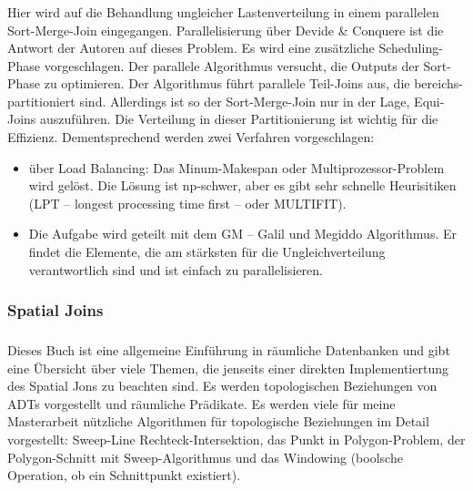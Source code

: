 \documentclass[a4paper,12pt,twoside]{article}
\begin{document}
\subsubsection*{}

Hier wird auf die Behandlung ungleicher Lastenverteilung in einem parallelen Sort-Merge-Join eingegangen. Parallelisierung über Devide \& Conquere ist die Antwort der Autoren auf dieses Problem. Es wird eine zusätzliche Scheduling-Phase vorgeschlagen. Der parallele Algorithmus versucht, die Outputs der Sort-Phase zu optimieren. Der Algorithmus führt parallele Teil-Joins aus, die bereichs-partitioniert sind. Allerdings ist so der Sort-Merge-Join nur in der Lage, Equi-Joins auszuführen. Die Verteilung in dieser Partitionierung ist wichtig für die Effizienz. Dementsprechend werden zwei Verfahren vorgeschlagen: 

\begin{itemize}
	\item über Load Balancing: Das Minum-Makespan oder Multiprozessor-Problem wird gelöst. Die Lösung ist np-schwer, aber es gibt sehr schnelle Heurisitiken (LPT -- longest processing time first -- oder MULTIFIT).
	\item Die Aufgabe wird geteilt mit dem GM -- Galil und Megiddo Algorithmus. Er findet die Elemente, die am stärksten für die Ungleichverteilung verantwortlich sind und ist einfach zu parallelisieren.
\end{itemize}

\subsubsection{Spatial Joins}

\subsubsection*{}

Dieses Buch ist eine allgemeine Einführung in räumliche Datenbanken und gibt eine Übersicht über viele Themen, die jenseits einer direkten Implementiertung des Spatial Jons zu beachten sind. Es werden topologischen Beziehungen von ADTs vorgestellt und räumliche Prädikate. Es werden viele für meine Masterarbeit nützliche Algorithmen für topologische Beziehungen im Detail vorgestellt: Sweep-Line Rechteck-Intersektion, das Punkt in Polygon-Problem, der Polygon-Schnitt mit Sweep-Algorithmus und das Windowing (boolsche Operation, ob ein Schnittpunkt existiert).
\end{document}
